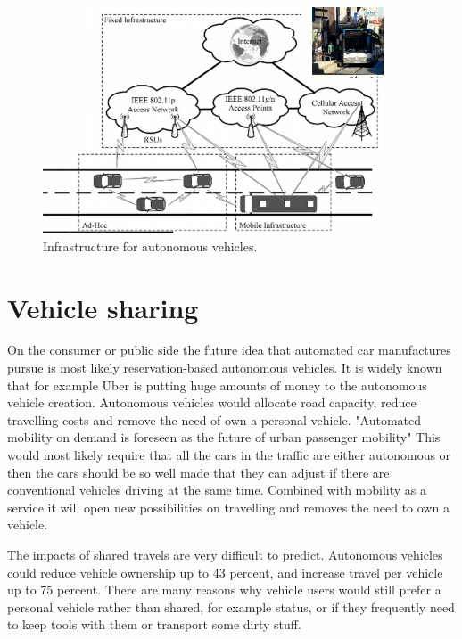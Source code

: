 \documentclass[english]{tktltiki}
\begin{document}
\begin{figure}[h]
\ \newline
\begin{center}
\includegraphics[width=0.9\textwidth]{infra.png}
\caption{Infrastructure for autonomous vehicles. 
\cite{trafficmodels}}
\label{infrastructure}
\end{center}
\end{figure}


\section{Vehicle sharing}
On the consumer or public side the future idea that automated car manufactures 
pursue is most likely reservation-based autonomous vehicles. It is widely known 
that for example Uber is putting huge amounts of money to the autonomous vehicle 
creation. Autonomous vehicles would allocate road capacity, reduce travelling 
costs and remove the need of own a personal vehicle. \cite{ondemand} "Automated 
mobility on demand is foreseen as the future of urban passenger mobility" 
\cite{ondemand} This would most likely require that all the cars in the traffic 
are either autonomous or then the cars should be so well made that they can 
adjust if there are conventional vehicles driving at the same time. Combined 
with mobility as a service it will open new possibilities on travelling and 
removes the need to own a vehicle. 

The impacts of shared travels are very 
difficult to predict. Autonomous vehicles could reduce vehicle ownership up to 
43 percent, and increase travel per vehicle up to 75 percent. 
\cite{transportpolicy} There are many reasons why vehicle users would still 
prefer a personal vehicle rather than shared, for example status, or if they 
frequently need to keep tools with them or transport some dirty stuff.
\end{document}

